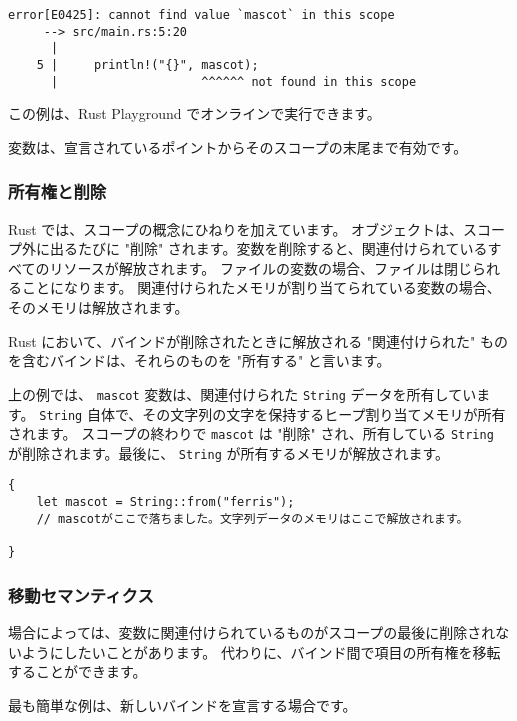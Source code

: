 \begin{lstlisting}[numbers=none]
    error[E0425]: cannot find value `mascot` in this scope
     --> src/main.rs:5:20
      |
    5 |     println!("{}", mascot);
      |                    ^^^^^^ not found in this scope
\end{lstlisting}

この例は、Rust Playground でオンラインで実行できます。

変数は、宣言されているポイントからそのスコープの末尾まで有効です。

\subsubsection{所有権と削除}

Rust では、スコープの概念にひねりを加えています。 オブジェクトは、スコープ外に出るたびに "削除" されます。変数を削除すると、関連付けられているすべてのリソースが解放されます。 ファイルの変数の場合、ファイルは閉じられることになります。 関連付けられたメモリが割り当てられている変数の場合、そのメモリは解放されます。

Rust において、バインドが削除されたときに解放される "関連付けられた" ものを含むバインドは、それらのものを "所有する" と言います。

上の例では、 \texttt{mascot} 変数は、関連付けられた \texttt{String} データを所有しています。 \texttt{String} 自体で、その文字列の文字を保持するヒープ割り当てメモリが所有されます。 スコープの終わりで \texttt{mascot} は "削除" され、所有している \texttt{String} が削除されます。最後に、 \texttt{String} が所有するメモリが解放されます。



\begin{lstlisting}[numbers=none]
{
    let mascot = String::from("ferris");
    // mascotがここで落ちました。文字列データのメモリはここで解放されます。

}
\end{lstlisting}

\subsubsection{移動セマンティクス}

場合によっては、変数に関連付けられているものがスコープの最後に削除されないようにしたいことがあります。 代わりに、バインド間で項目の所有権を移転することができます。

最も簡単な例は、新しいバインドを宣言する場合です。

